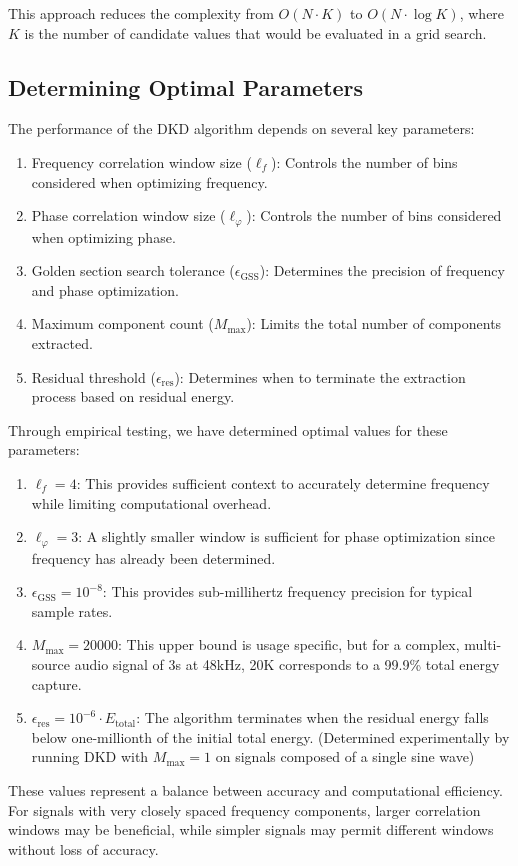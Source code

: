 \documentclass[11pt,twoside]{report}
\numberwithin{thm}{section}
\numberwithin{equation}{section}
\begin{document}
This approach reduces the complexity from $O(N \cdot K)$ to $O(N \cdot \log K)$, where $K$ is the number of candidate values that would be evaluated in a grid search.
\clearpage
\subsection{Determining Optimal Parameters}
\label{subsubsec:determining_optimal_parameters}
The performance of the DKD algorithm depends on several key parameters:
\begin{enumerate}
    \item Frequency correlation window size ($\ell_f$): Controls the number of bins considered when optimizing frequency.
    \item Phase correlation window size ($\ell_\varphi$): Controls the number of bins considered when optimizing phase.
    \item Golden section search tolerance ($\epsilon_{\text{GSS}}$): Determines the precision of frequency and phase optimization.
    \item Maximum component count ($M_{\max}$): Limits the total number of components extracted.
    \item Residual threshold ($\epsilon_{\text{res}}$): Determines when to terminate the extraction process based on residual energy.
\end{enumerate}
Through empirical testing, we have determined optimal values for these parameters:
\begin{enumerate}
    \item $\ell_f = 4$: This provides sufficient context to accurately determine frequency while limiting computational overhead.
    \item $\ell_\varphi = 3$: A slightly smaller window is sufficient for phase optimization since frequency has already been determined.
    \item $\epsilon_{\text{GSS}} = 10^{-8}$: This provides sub-millihertz frequency precision for typical sample rates.
    \item $M_{\max} = 20000$: This upper bound is usage specific, but for a complex, multi-source audio signal of 3s at 48kHz, 20K corresponds to a 99.9\% total energy capture. 
    \item $\epsilon_{\text{res}} = 10^{-6} \cdot E_{\text{total}}$: The algorithm terminates when the residual energy falls below one-millionth of the initial total energy. (Determined experimentally by running DKD with $M_{\max}=1$ on signals composed of a single sine wave)
\end{enumerate}
These values represent a balance between accuracy and computational efficiency. For signals with very closely spaced frequency components, larger correlation windows may be beneficial, while simpler signals may permit different windows without loss of accuracy. 
\end{document}

